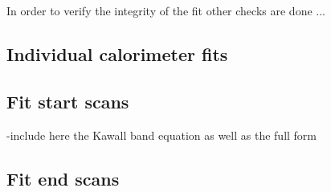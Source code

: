 




In order to verify the integrity of the fit other checks are done ... 


\subsection{Individual calorimeter fits}
\label{sub:per_calorimeter_fits}


\subsection{Fit start scans}

-include here the Kawall band equation as well as the full form


\subsection{Fit end scans}


